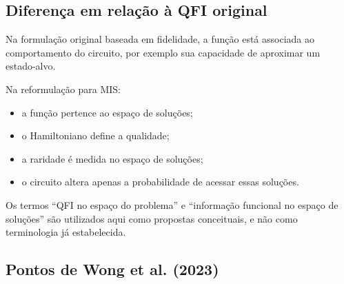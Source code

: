 \documentclass[11pt,a4paper]{article}
\begin{document}
\subsection{Diferença em relação à QFI original}

Na formulação original baseada em fidelidade, a função está associada
ao comportamento do circuito, por exemplo sua capacidade de aproximar
um estado-alvo.

Na reformulação para MIS:

\begin{itemize}[leftmargin=1.5em]

    \item a função pertence ao espaço de soluções;

    \item o Hamiltoniano define a qualidade;

    \item a raridade é medida no espaço de soluções;

    \item o circuito altera apenas a probabilidade de acessar essas soluções.

\end{itemize}

Os termos ``QFI no espaço do problema'' e
``informação funcional no espaço de soluções'' são utilizados aqui
como propostas conceituais, e não como terminologia já estabelecida.

\subsection{Pontos de Wong et al. (2023)}
\end{document}
